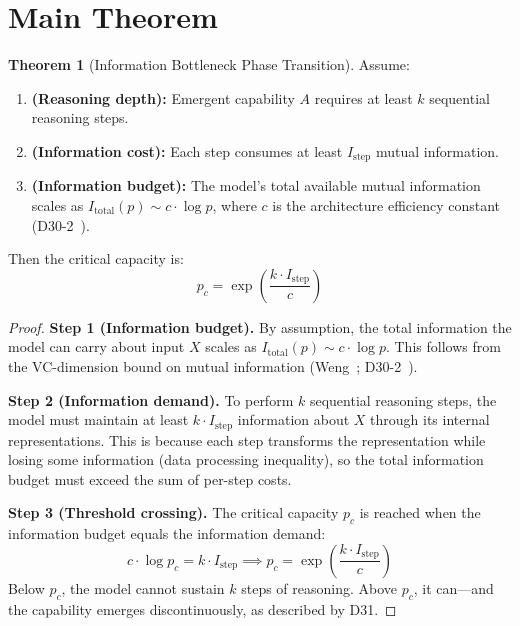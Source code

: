 \documentclass[12pt]{article}
\theoremstyle{definition}
\newtheorem{theorem}[definition]{Theorem}
\theoremstyle{remark}
\begin{document}
\section{Main Theorem}

\begin{theorem}[Information Bottleneck Phase Transition]\label{thm:main}
Assume:
\begin{enumerate}
  \item \textbf{(Reasoning depth):} Emergent capability $A$ requires at least $k$ sequential reasoning steps.
  \item \textbf{(Information cost):} Each step consumes at least $I_{\mathrm{step}}$ mutual information.
  \item \textbf{(Information budget):} The model's total available mutual information scales as $I_{\mathrm{total}}(p) \sim c \cdot \log p$, where $c$ is the architecture efficiency constant (D30-2~\cite{lu2026-d30-2}).
\end{enumerate}
Then the critical capacity is:
\begin{equation}
p_c = \exp\left(\frac{k \cdot I_{\mathrm{step}}}{c}\right)
\end{equation}
\end{theorem}

\begin{proof}
\textbf{Step 1 (Information budget).} By assumption, the total information the model can carry about input $X$ scales as $I_{\mathrm{total}}(p) \sim c \cdot \log p$. This follows from the VC-dimension bound on mutual information (Weng~\cite{weng2020information}; D30-2~\cite{lu2026-d30-2}).

\textbf{Step 2 (Information demand).} To perform $k$ sequential reasoning steps, the model must maintain at least $k \cdot I_{\mathrm{step}}$ information about $X$ through its internal representations. This is because each step transforms the representation while losing some information (data processing inequality), so the total information budget must exceed the sum of per-step costs.

\textbf{Step 3 (Threshold crossing).} The critical capacity $p_c$ is reached when the information budget equals the information demand:
\[
c \cdot \log p_c = k \cdot I_{\mathrm{step}} \implies p_c = \exp\left(\frac{k \cdot I_{\mathrm{step}}}{c}\right)
\]
Below $p_c$, the model cannot sustain $k$ steps of reasoning. Above $p_c$, it can---and the capability emerges discontinuously, as described by D31.
\end{proof}
\end{document}
